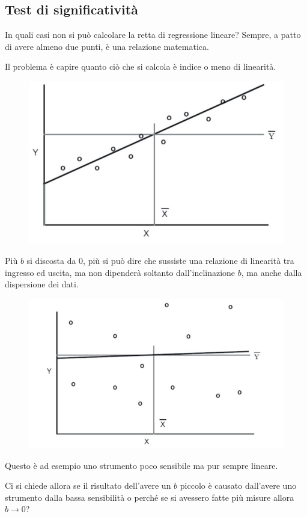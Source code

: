 \documentclass[a4paper, 15pt]{article}
\begin{document}
\subsection{Test di significatività}
\begin{adjustwidth}{2in}{}	
	In quali casi non si può calcolare la retta di regressione lineare? Sempre, a patto di avere almeno due punti, è una relazione matematica. \newline 
	
	Il problema è capire quanto ciò che si calcola è indice o meno di linearità.
	\begin{figure}[H]
		\centering
		\includegraphics[width=0.5\linewidth]{fig/screenshot011}
		\label{fig:screenshot011}
	\end{figure}	
	Più $b$ si discosta da 0, più si può dire che sussiste una relazione di linearità tra ingresso ed uscita, ma non dipenderà soltanto dall'inclinazione $b$, ma anche dalla dispersione dei dati. 
\begin{figure}[H]
	\centering
	\includegraphics[width=0.5\linewidth]{fig/screenshot012}
	\label{fig:screenshot012}
\end{figure}
	Questo è ad esempio uno strumento poco sensibile ma pur sempre lineare.
	
	Ci si chiede allora se il risultato dell'avere un $b$ piccolo è causato dall'avere uno strumento dalla bassa sensibilità o perché se si avessero fatte più misure allora $b\rightarrow0$? \newline 
\end{adjustwidth}
\end{document}

